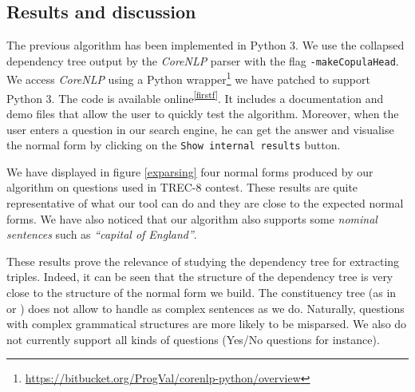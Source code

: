 
\subsection{Results and discussion}

The previous algorithm has been implemented in Python 3. We use the collapsed dependency tree output by the \textit{CoreNLP} parser with the flag \texttt{-makeCopulaHead}. We access \textit{CoreNLP} using a Python wrapper\footnote{\url{https://bitbucket.org/ProgVal/corenlp-python/overview}} we have patched to support Python 3. The code is available online\textsuperscript{\ref{firstf}}. It includes a documentation and demo files that allow the user to quickly test the algorithm. Moreover, when the user enters a question in our search engine, he can get the answer and visualise the normal form by clicking on the \texttt{Show internal results} button.

We have displayed in figure \ref{exparsing} four normal forms produced by our algorithm on questions used in TREC-8 contest. These results are quite representative of what our tool can do and they are close to the expected normal forms. We have also noticed that our algorithm also supports some \textit{nominal sentences} such as \textit{``capital of England''}. 

These results prove the relevance of studying the dependency tree for extracting triples. Indeed, it can be seen that the structure of the dependency tree is very close to the structure of the normal form we build. The constituency tree (as in \cite{parsetree} or \cite{parsetree2}) does not allow to handle as complex sentences as we do. Naturally, questions with complex grammatical structures are more likely to be misparsed. We also do not currently support all kinds of questions (Yes/No questions for instance).

